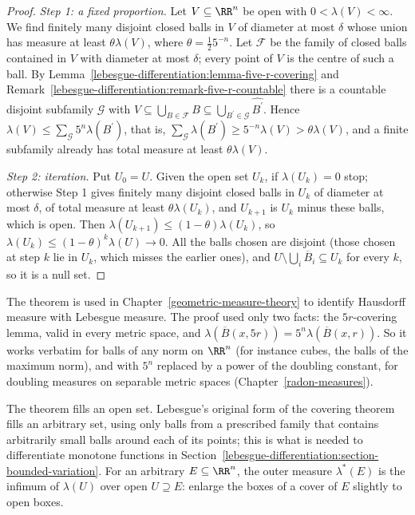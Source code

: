 \begin{proof}
\emph{Step 1: a fixed proportion.} Let $V \subseteq \RR^n$ be open with $0 < \lambda(V) < \infty$. We find finitely many disjoint closed balls in $V$ of diameter at most $\delta$ whose union has measure at least
$\theta\lambda(V)$, where $\theta = \frac12 5^{-n}$. Let $\mathcal{F}$ be the family of closed balls contained in $V$ with diameter at most $\delta$; every point of $V$ is the centre of such a ball. By
Lemma~\ref{lebesgue-differentiation:lemma-five-r-covering} and Remark~\ref{lebesgue-differentiation:remark-five-r-countable} there is a countable disjoint subfamily $\mathcal{G}$ with
$V \subseteq \bigcup_{B \in \mathcal{F}}B \subseteq \bigcup_{B^{\prime} \in \mathcal{G}}\widehat{B^{\prime}}$. Hence $\lambda(V) \leq \sum_{\mathcal{G}}5^n\lambda(B^{\prime})$, that is,
$\sum_{\mathcal{G}}\lambda(B^{\prime}) \geq 5^{-n}\lambda(V) > \theta\lambda(V)$, and a finite subfamily already has total measure at least $\theta\lambda(V)$.

\emph{Step 2: iteration.} Put $U_0 = U$. Given the open set $U_k$, if $\lambda(U_k) = 0$ stop; otherwise Step 1 gives finitely many disjoint closed balls in $U_k$ of diameter at most $\delta$, of total measure
at least $\theta\lambda(U_k)$, and $U_{k+1}$ is $U_k$ minus these balls, which is open. Then $\lambda(U_{k+1}) \leq (1 - \theta)\lambda(U_k)$, so $\lambda(U_k) \leq (1 - \theta)^k\lambda(U) \to 0$. All
the balls chosen are disjoint (those chosen at step $k$ lie in $U_k$, which misses the earlier ones), and $U \setminus \bigcup_i\overline{B}_i \subseteq U_k$ for every $k$, so it is a null set.
\end{proof}

The theorem is used in Chapter~\ref{geometric-measure-theory} to identify Hausdorff measure with Lebesgue measure. The proof used only two facts: the $5r$-covering lemma, valid in every metric
space, and $\lambda(\overline{B}(x, 5r)) = 5^n\lambda(\overline{B}(x, r))$. So it works verbatim for balls of any norm on $\RR^n$ (for instance cubes, the balls of the maximum norm), and with
$5^n$ replaced by a power of the doubling constant, for doubling measures on separable metric spaces (Chapter~\ref{radon-measures}).

The theorem fills an open set. Lebesgue's original form of the covering theorem fills an arbitrary set, using only balls from a prescribed family that contains arbitrarily small balls around each of
its points; this is what is needed to differentiate monotone functions in Section~\ref{lebesgue-differentiation:section-bounded-variation}. For an arbitrary $E \subseteq \RR^n$, the outer measure
$\lambda^*(E)$ is the infimum of $\lambda(U)$ over open $U \supseteq E$: enlarge the boxes of a cover of $E$ slightly to open boxes.


